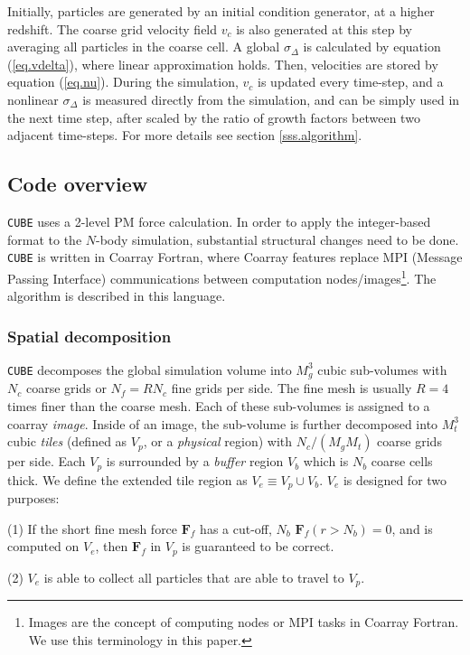 \documentclass[10pt,twocolumn,preprint]{emulateapj}
\newcommand{\bs}{\boldsymbol}
\begin{document}
Initially, particles are generated by an initial condition generator, at a higher redshift. The coarse grid velocity field $v_c$ is also generated at this step by averaging all particles in the coarse cell. A global $\sigma_\Delta$ is calculated by equation (\ref{eq.vdelta}), where linear approximation holds. Then, velocities are stored by equation (\ref{eq.nu}). During the simulation, $v_c$ is updated every time-step, and a nonlinear $\sigma_\Delta$ is measured directly from the simulation, and can be simply used in the next time step, after scaled by the ratio of growth factors between two adjacent time-steps. For more details see section \ref{sss.algorithm}.

\subsection{Code overview}\label{ss.overview}
{\tt CUBE} uses a 2-level PM force calculation. In order to apply the integer-based format to the $N$-body simulation, substantial structural changes need to be done. {\tt CUBE} is written in Coarray Fortran, where Coarray features replace MPI (Message Passing Interface) communications between computation nodes/images\footnote{Images are the concept of computing nodes or MPI tasks in Coarray Fortran. We use this terminology in this paper.}. The algorithm is described in this language.

\subsubsection{Spatial decomposition}\label{sss.spatial_decomposition}
{\tt CUBE} decomposes the global simulation volume into $M_g^3$ cubic sub-volumes with $N_c$ coarse grids or $N_f=RN_c$ fine grids per side. The fine mesh is usually $R=4$ times finer than the coarse mesh. Each of these sub-volumes is assigned to a coarray {\it image}. Inside of an image, the sub-volume is further decomposed into $M_t^3$ cubic {\it tiles} (defined as $V_p$, or a {\it physical} region) with $N_c/(M_g M_t)$ coarse grids per side. Each $V_p$ is surrounded by a {\it buffer} region $V_b$ which is $N_b$ coarse cells thick. We define the extended tile region as $V_e\equiv V_p\cup V_b$. $V_e$ is designed for two purposes:

(1) If the short fine mesh force ${\bs F}_f$ has a cut-off, $N_b$ ${\bs F}_f(r>N_b)=0$, and is computed on $V_e$, then ${\bs F}_f$ in $V_p$ is guaranteed to be correct. 

(2) $V_e$ is able to collect all particles that are able to travel to $V_p$.
\end{document}
